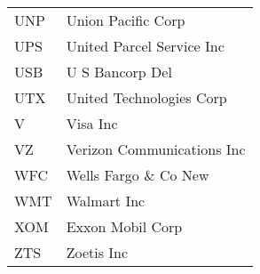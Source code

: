 \begin{tabular}{ll}
UNP    &                Union Pacific Corp \\
UPS    &         United Parcel Service Inc \\
USB    &                   U S Bancorp Del \\
UTX    &          United Technologies Corp \\
V      &                          Visa Inc \\
VZ     &        Verizon Communications Inc \\
WFC    &             Wells Fargo \& Co New \\
WMT    &                       Walmart Inc \\
XOM    &                  Exxon Mobil Corp \\
ZTS    &                        Zoetis Inc \\
\bottomrule
\end{tabular}
